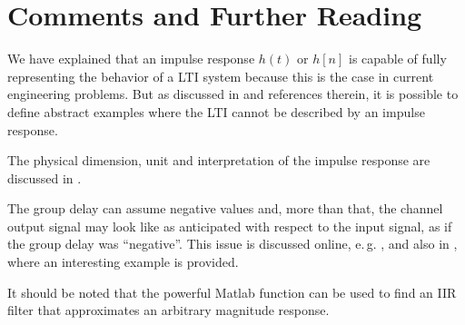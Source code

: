 
\section{Comments and Further Reading}


We have explained that an impulse response $h(t)$ or $h[n]$ is capable of fully representing the behavior of a LTI system because this is the case in current engineering problems. But as discussed in \cite{Vogel12} and references therein, it is possible to define abstract examples where the LTI cannot be described by an impulse response.

The physical dimension, unit and interpretation of the impulse response are discussed in \cite{Glover06,Potrebic10}.

The group delay can assume negative values and, more than that, the channel output signal may look like as anticipated with respect to the input signal, as if the group delay was ``negative''. This issue is discussed online, e.\,g. , and also in \cite{Mitchell97b}, where an interesting example is provided.

It should be noted that the powerful Matlab function  can be used to find an IIR filter that
approximates an arbitrary magnitude response. 



